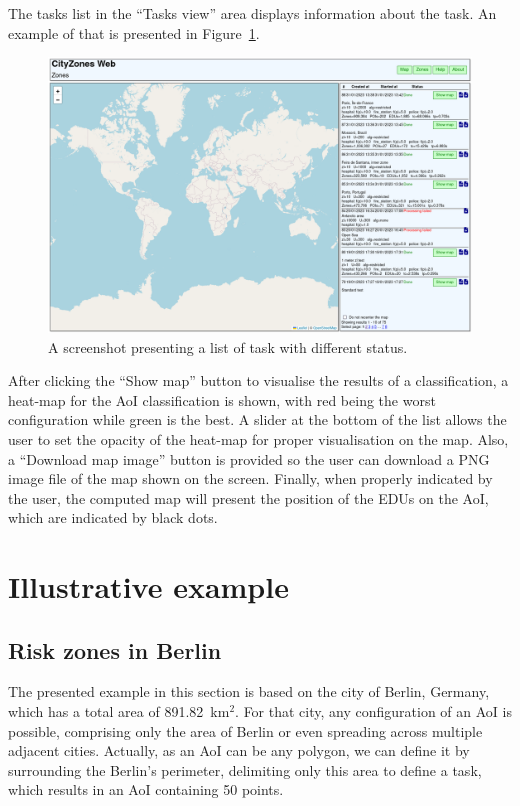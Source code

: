 \begin{refsection}
The tasks list in the ``Tasks view'' area displays information about the task. An example of that is presented in Figure~\ref{fig:web_zones}.

\begin{figure}[htb]
  \centering
  \includegraphics[width=.8\linewidth]{Chapters/4-CityZones/img/cityzones_zones_list.png}
  \caption{A screenshot presenting a list of task with different status.}\label{fig:web_zones}
\end{figure}

After clicking the ``Show map'' button to visualise the results of a classification, a heat-map for the AoI classification is shown, with red being the worst configuration while green is the best. A slider at the bottom of the list allows the user to set the opacity of the heat-map for proper visualisation on the map. Also, a ``Download map image'' button is provided so the user can download a PNG image file of the map shown on the screen. Finally, when properly indicated by the user, the computed map will present the position of the EDUs on the AoI, which are indicated by black dots.

\section{Illustrative example}

\subsection {Risk zones in Berlin}

The presented example in this section is based on the city of Berlin, Germany, which has a total area of 891.82~km$^2$. For that city, any configuration of an AoI is possible, comprising only the area of Berlin or even spreading across multiple adjacent cities. Actually, as an AoI can be any polygon, we can define it by surrounding the Berlin's perimeter, delimiting only this area to define a task, which results in an AoI containing 50 points.


\end{refsection}
